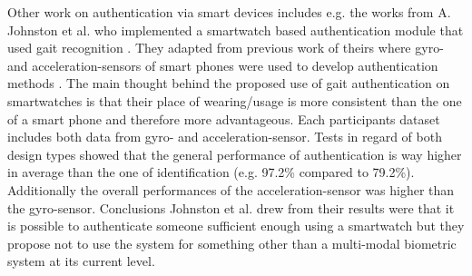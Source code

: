 Other work on authentication via smart devices includes e.g. the works from A. Johnston et al. who implemented a smartwatch based authentication module that used gait recognition \cite{johnston2015smartwatch}.
They adapted from previous work of theirs where gyro- and acceleration-sensors of smart phones were used to develop authentication methods \cite{kwapisz2010cell}.
The main thought behind the proposed use of gait authentication on smartwatches is that their place of wearing/usage is more consistent than the one of a smart phone and therefore more advantageous.
Each participants dataset includes both data from gyro- and acceleration-sensor.
Tests in regard of both design types showed that the general performance of authentication is way higher in average than the one of identification (e.g. 97.2\% compared to 79.2\%).
Additionally the overall performances of the acceleration-sensor was higher than the gyro-sensor.
Conclusions Johnston et al. drew from their results were that it is possible to authenticate someone sufficient enough using a smartwatch but they propose not to use the system for something other than a multi-modal biometric system at its current level. 
\newpage
%
%

